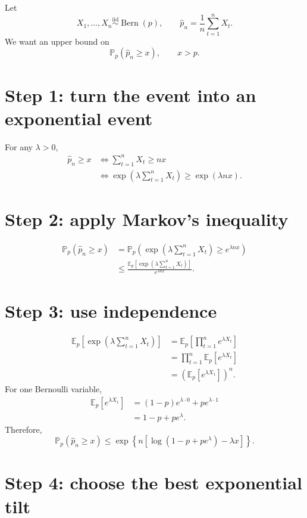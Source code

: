 \documentclass[en,nofont,11pt]{elegantbook}
\newcommand{\E}{\mathbb{E}}
\newcommand{\Pbb}{\mathbb{P}}
\newcommand{\Ber}{\operatorname{Bern}}
\begin{document}
Let
\[
X_1,\ldots,X_n\overset{\mathrm{iid}}{\sim}\Ber(p),
\qquad
\widehat p_n=\frac1n\sum_{t=1}^{n}X_t.
\]
We want an upper bound on
\[
\Pbb_p(\widehat p_n\ge x),
\qquad x>p.
\]

\section{Step 1: turn the event into an exponential event}

For any $\lambda>0$,
\begin{align*}
\widehat p_n\ge x
&\Longleftrightarrow
\sum_{t=1}^{n}X_t\ge nx\\
&\Longleftrightarrow
\exp\left(\lambda\sum_{t=1}^{n}X_t\right)
\ge
\exp(\lambda nx).
\end{align*}

\section{Step 2: apply Markov's inequality}

\begin{align*}
\Pbb_p(\widehat p_n\ge x)
&=
\Pbb_p\left(
\exp\left(\lambda\sum_{t=1}^{n}X_t\right)
\ge e^{\lambda nx}
\right)\\
&\le
\frac{
\E_p\left[
\exp\left(\lambda\sum_{t=1}^{n}X_t\right)
\right]
}{e^{\lambda nx}}.
\end{align*}

\section{Step 3: use independence}

\begin{align*}
\E_p\left[
\exp\left(\lambda\sum_{t=1}^{n}X_t\right)
\right]
&=
\E_p\left[
\prod_{t=1}^{n}e^{\lambda X_t}
\right]\\
&=
\prod_{t=1}^{n}\E_p[e^{\lambda X_t}]\\
&=
\left(\E_p[e^{\lambda X_1}]\right)^n.
\end{align*}
For one Bernoulli variable,
\begin{align*}
\E_p[e^{\lambda X_1}]
&=
(1-p)e^{\lambda\cdot0}+pe^{\lambda\cdot1}\\
&=
1-p+pe^\lambda.
\end{align*}
Therefore,
\[
\Pbb_p(\widehat p_n\ge x)
\le
\exp\left
\{n\left[
\log(1-p+pe^\lambda)-\lambda x
\right]
\right\}.
\]

\section{Step 4: choose the best exponential tilt}
\end{document}
